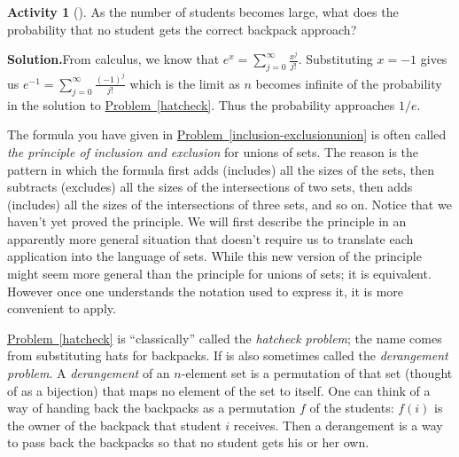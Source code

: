 \documentclass[10pt,]{book}
\theoremstyle{plain}
\theoremstyle{definition}
\newtheorem{activity}[project]{Activity}
\numberwithin{equation}{chapter}
\begin{document}
\begin{activity}[]\label{activity-213}
As the number of students becomes large, what does the probability that no student gets the correct backpack approach?%
\par\medskip\noindent%
\textbf{Solution.}\quad From calculus, we know that \(e^x=\sum_{j=0}^\infty \frac{x^j}{j!}\). Substituting \(x=-1\) gives us \(e^{-1}=\sum_{j=0}^\infty
\frac{(-1)^j}{j!}\) which is the limit as \(n\) becomes infinite of the probability in the solution to \hyperref[hatcheck]{Problem~\ref{hatcheck}}. Thus the probability approaches \(1/e\).%
\end{activity}
The formula you have given in \hyperref[inclusion-exclusionunion]{Problem~\ref{inclusion-exclusionunion}} is often called \emph{the principle of inclusion and exclusion} for unions of sets. The reason is the pattern in which the formula first adds (includes) all the sizes of the sets, then subtracts (excludes) all the sizes of the intersections of two sets, then adds (includes) all the sizes of the intersections of three sets, and so on. Notice that we haven't yet proved the principle. We will first describe the principle in an apparently more general situation that doesn't require us to translate each application into the language of sets. While this new version of the principle might seem more general than the principle for unions of sets; it is equivalent. However once one understands the notation used to express it, it is more convenient to apply.%
\par
\hyperref[hatcheck]{Problem~\ref{hatcheck}} is ``classically'' called the \emph{hatcheck problem}; the name comes from substituting hats for backpacks. If is also sometimes called the \emph{derangement problem}. A \emph{derangement} of an \(n\)-element set is a permutation of that set (thought of as a bijection) that maps no element of the set to itself. One can think of a way of handing back the backpacks as a permutation \(f\) of the students: \(f(i)\) is the owner of the backpack that student \(i\) receives. Then a derangement is a way to pass back the backpacks so that no student gets his or her own.%
\typeout{************************************************}
\typeout{************************************************}
\end{document}
